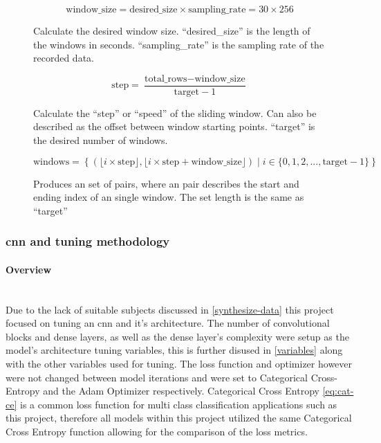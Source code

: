 \documentclass[12pt]{article}
\begin{document}
\begin{figure}[H]
\[ \text{{window\_size}} = \text{{desired\_size}} \times \text{{sampling\_rate}} = 30 \times 256   \]
\caption{Calculate the desired window size. ``desired\_size'' is the length of the windows in seconds. ``sampling\_rate'' is the sampling rate of the recorded data.}
\label{eq:window-size}
\end{figure}


\begin{figure}[H]
\[ \text{{step}} = \frac{{\text{{total\_rows}} - \text{{window\_size}}}}{{\text{{target}} - 1}}  \]
\caption{Calculate the ``step'' or ``speed'' of the sliding window. Can also be described as the offset between window starting points. ``target'' is the desired number of windows.}
\label{eq:step}
\end{figure}

\begin{figure}[H]
\[ \text{{windows}} = \left\{ \left( \lfloor i \times \text{{step}} \rfloor, \lfloor i \times \text{{step}} + \text{{window\_size}} \rfloor \right) \mid i \in \{0, 1, 2, ..., \text{{target}} - 1\} \right\}  \]
\caption{Produces an set of pairs, where an pair describes the start and ending index of an single window. The set length is the same as ``target''}
\label{eq:windows}
\end{figure}

\subsubsection{\acrfull{cnn} and tuning methodology}

\paragraph{Overview}\mbox{}\\

Due to the lack of suitable subjects discussed in \ref{synthesize-data} this project focused on tuning an \acrshort{cnn} and it's architecture. The number of convolutional blocks and dense layers, as well as the dense layer's complexity were setup as the model's architecture tuning variables, this is further disused in \ref{variables} along with the other variables used for tuning. The loss function and optimizer however were not changed between model iterations and were set to Categorical Cross-Entropy and the Adam Optimizer respectively. Categorical Cross Entropy \ref{eq:cat-ce} is a common loss function for multi class classification applications such as this project, therefore all models within this project utilized the same Categorical Cross Entropy function allowing for the comparison of the loss metrics.
\end{document}
